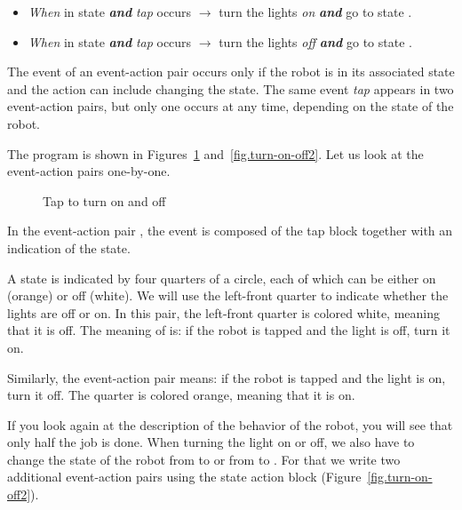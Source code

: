 \begin{itemize}

\item \emph{When} in state  \textbf{\textit{and}} \emph{tap}
occurs $\rightarrow$ turn the lights \emph{on} \textbf{\textit{and}} go
to state .

\item \emph{When} in state  \textbf{\textit{and}} \emph{tap}
occurs $\rightarrow$ turn the lights \emph{off} \textbf{\textit{and}} go
to state .

\end{itemize} The event of an event-action pair occurs only if the robot
is in its associated state and the action can include changing the
state. The same event \emph{tap} appears in two event-action pairs, but
only one occurs at any time, depending on the state of the robot.

The program is shown in Figures~\ref{fig.turn-on-off1}
and~\ref{fig.turn-on-off2}. Let us look at the event-action pairs
one-by-one.

\begin{figure}
\begin{center}
\caption{Tap to turn on and off}\label{fig.turn-on-off1}
\end{center}
\end{figure}

In the event-action pair , the event is composed of the
tap block together with an indication of the state.

A state is indicated by four quarters of a circle, each of which can be
either on (orange) or off (white). We will use the left-front quarter to
indicate whether the lights are off or on. In this pair, the left-front
quarter is colored white, meaning that it is off. The meaning of
 is: if the robot is tapped and the light is off, turn
it on.

Similarly, the event-action pair  means: if the robot
is tapped and the light is on, turn it off. The quarter is colored
orange, meaning that it is on.

If you look again at the description of the behavior of the robot, you
will see that only half the job is done. When turning the light on or
off, we also have to change the state of the robot from  to
 or from  to . For that we write two
additional event-action pairs using the state action block
 (Figure~\ref{fig.turn-on-off2}).


